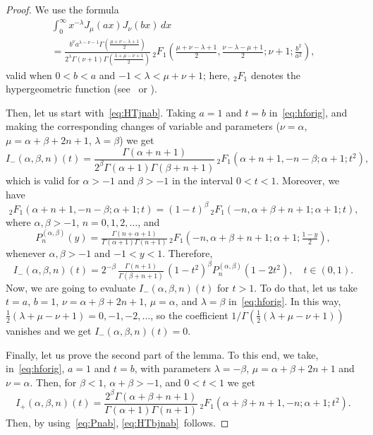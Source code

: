 \documentclass[11pt,a4paper]{amsart}
\theoremstyle{plain}
\theoremstyle{definition}
\begin{document}
\begin{proof}
We use the formula
\begin{multline}
\label{eq:hforig}
  \int_{0}^{\infty}x^{-\lambda }J_{\mu }(ax)J_{\nu }(bx)\,dx \\
  = \frac{b^{\nu }a^{\lambda -\nu -1}\Gamma(\frac{\mu +\nu -\lambda+1}{2})}
  {2^{\lambda }\Gamma(\nu +1)\Gamma(\frac{\lambda+\mu -\nu +1}{2})}
  {\,{}_{2}F_{1}} \left( \frac{\mu +\nu -\lambda+1}{2},
  \frac{\nu-\lambda-\mu+1}{2}; \nu+1; \frac{b^{2}}{a^{2}}\right),
\end{multline}
valid when $0<b<a$ and $-1<\lambda<\mu+\nu+1$;
here, ${{}_{2}F_{1}}$ denotes the hypergeometric function
(see~\cite[Ch.~8.11, (9), p.~48]{E-TIT-II} or \cite[Ch.~XIII, 13.4
(2), p.~401]{Wat}).

Then, let us start with~\eqref{eq:HTjnab}. Taking $a = 1$ and $t = b$
in~\eqref{eq:hforig}, and making the corresponding changes of variable and
parameters ($\nu = \alpha$, $\mu = \alpha+\beta+2n+1$, $\lambda = \beta$) we get
\begin{equation*}
  I_{-}(\alpha,\beta,n)(t)
  = \frac{\Gamma(\alpha+n+1)} {2^\beta \Gamma(\alpha+1) \Gamma(\beta+n+1)}
  {\,{}_2F_1}(\alpha+n+1,-n-\beta;\alpha+1;t^2),
\end{equation*}
which is valid for $\alpha>-1$ and $\beta>-1$ in the interval $0<t<1$.
Moreover, we have
\begin{equation*}
{\,{}_2F_1}(\alpha+n+1,-n-\beta;\alpha+1;t)
= (1-t)^\beta {\,{}_2F_1}(-n,\alpha+\beta+n+1;\alpha+1;t),
\end{equation*}
where $\alpha,\beta>-1$, $n = 0,1,2,\dots$, and
\begin{equation}
\label{eq:Pnab}
  P_n^{(\alpha,\beta)}(y) = \tfrac{\Gamma(n+\alpha+1)}{\Gamma(\alpha+1)
  \Gamma(n+1)} {\,{}_2F_1}(-n, \alpha+\beta+n+1; \alpha+1; \tfrac{1-y}2),
\end{equation}
whenever $\alpha, \beta> -1$ and $-1 < y < 1$. Therefore,
\begin{equation*}
  I_{-}(\alpha,\beta,n)(t)
  = 2^{-\beta} \, \tfrac{\Gamma(n+1)}{\Gamma(\beta+n+1)} \, (1-t^2)^\beta
  P^{(\alpha,\beta)}_n(1-2t^2), \quad t \in (0,1).
\end{equation*}
Now, we are going to evaluate
$I_{-}(\alpha,\beta,n)(t)$ for $t>1$. To do
that, let us take $t = a$, $b = 1$, $\nu = \alpha+\beta+2n+1$, $\mu = \alpha$, and
$\lambda = \beta$ in~\eqref{eq:hforig}. In this way,
$\frac12(\lambda+\mu-\nu+1) = 0,-1, -2, \dots$, so the coefficient
$1/\Gamma(\frac12(\lambda+\mu-\nu+1))$ vanishes and we get
$I_{-}(\alpha,\beta,n)(t) = 0$.

Finally, let us prove the second part of the lemma. To this end, we take, in~\eqref{eq:hforig},
$a = 1$ and $t = b$, with parameters $\lambda = -\beta$, $\mu
= \alpha+\beta+2n+1$ and $\nu = \alpha$. Then, for $\beta<1$, $\alpha
+\beta>-1$, and $0<t<1$ we get
\begin{equation*}
  I_{+}(\alpha,\beta,n)(t)
  = \frac{2^{\beta} \Gamma(\alpha+\beta+n+1)}{\Gamma(\alpha+1) \Gamma(n+1)} 
  {\,{}_{2}F_{1}}(\alpha+\beta+n+1,-n;\alpha+1;t^{2}).
\end{equation*}
Then, by using~\eqref{eq:Pnab}, \eqref{eq:HTbjnab}~follows.
\end{proof}
\end{document}
